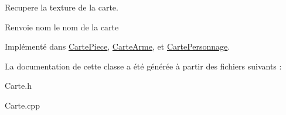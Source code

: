 \-Recupere la texture de la carte. 

\begin{DoxyReturn}{\-Renvoie}
nom le nom de la carte 
\end{DoxyReturn}


\-Implémenté dans \hyperlink{classCartePiece_ab3c9961822338a255a764b9247989e93}{\-Carte\-Piece}, \hyperlink{classCarteArme_ab0b8bfe3079c3565ccedd18a32f5c6a6}{\-Carte\-Arme}, et \hyperlink{classCartePersonnage_a3ec927c067fff46b9ba8999d946c50e2}{\-Carte\-Personnage}.



\-La documentation de cette classe a été générée à partir des fichiers suivants \-:\begin{DoxyCompactItemize}
\item 
\-Carte.\-h\item 
\-Carte.\-cpp\end{DoxyCompactItemize}
